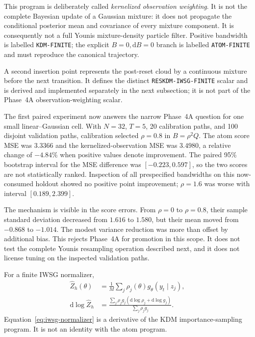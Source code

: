 \documentclass[11pt]{article}
\newcommand{\dd}{\mathrm{d}}
\begin{document}
This program is deliberately called \emph{kernelized observation weighting}.
It is not the complete Bayesian update of a Gaussian mixture: it does not
propagate the conditional posterior mean and covariance of every mixture
component.  It is consequently not a full Younis mixture-density particle
filter.  Positive bandwidth is labelled \texttt{KDM-FINITE}; the explicit
$B=0,\dd B=0$ branch is labelled \texttt{ATOM-FINITE} and must reproduce the
canonical trajectory.

A second insertion point represents the post-reset cloud by a continuous
mixture before the next transition.  It defines the distinct
\texttt{RESKDM-IWSG-FINITE} scalar and is derived and implemented separately
in the next subsection; it is not part of the Phase~4A
observation-weighting scalar.

The first paired experiment now answers the narrow Phase~4A question for one
small linear--Gaussian cell.  With $N=32$, $T=5$, 20 calibration paths, and
100 disjoint validation paths, calibration selected $\rho=0.8$ in
$B=\rho^2Q$.  The atom score MSE was $3.3366$ and the kernelized-observation
MSE was $3.4980$, a relative change of $-4.84\%$ when positive values denote
improvement.  The paired 95\% bootstrap interval for the MSE difference was
$[-0.223,0.597]$, so the two scores are not statistically ranked.  Inspection
of all prespecified bandwidths on this now-consumed holdout showed no positive
point improvement; $\rho=1.6$ was worse with interval $[0.189,2.399]$.

The mechanism is visible in the score errors.  From $\rho=0$ to $\rho=0.8$,
their sample standard deviation decreased from $1.616$ to $1.580$, but their
mean moved from $-0.868$ to $-1.014$.  The modest variance reduction was more
than offset by additional bias.  This rejects Phase~4A for promotion in this
scope.  It does not test the complete Younis resampling operation described
next, and it does not license tuning on the inspected validation paths.

For a finite IWSG normalizer,
\begin{align}
 \widehat Z_h(\theta)
   &=\frac{1}{M}\sum_j
       \rho_j(\theta)g_\theta(y_t\mid z_j),\\
 \dd\log\widehat Z_h
   &=\frac{\sum_j\rho_jg_j
       \left(\dd\log\rho_j+\dd\log g_j\right)}
           {\sum_j\rho_jg_j}.
 \label{eq:iwsg-normalizer}
\end{align}
Equation~\eqref{eq:iwsg-normalizer} is a derivative of the KDM
importance-sampling program.  It is not an identity with the atom program.
\end{document}
